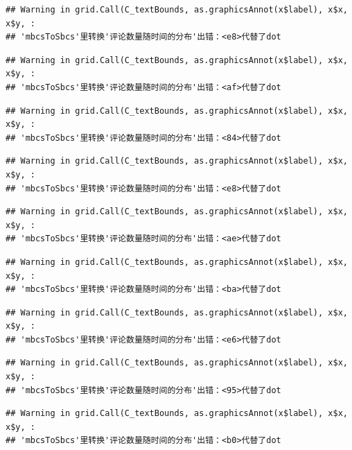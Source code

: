 \documentclass[
]{article}
\begin{document}
\begin{verbatim}
## Warning in grid.Call(C_textBounds, as.graphicsAnnot(x$label), x$x, x$y, :
## 'mbcsToSbcs'里转换'评论数量随时间的分布'出错：<e8>代替了dot
\end{verbatim}

\begin{verbatim}
## Warning in grid.Call(C_textBounds, as.graphicsAnnot(x$label), x$x, x$y, :
## 'mbcsToSbcs'里转换'评论数量随时间的分布'出错：<af>代替了dot
\end{verbatim}

\begin{verbatim}
## Warning in grid.Call(C_textBounds, as.graphicsAnnot(x$label), x$x, x$y, :
## 'mbcsToSbcs'里转换'评论数量随时间的分布'出错：<84>代替了dot
\end{verbatim}

\begin{verbatim}
## Warning in grid.Call(C_textBounds, as.graphicsAnnot(x$label), x$x, x$y, :
## 'mbcsToSbcs'里转换'评论数量随时间的分布'出错：<e8>代替了dot
\end{verbatim}

\begin{verbatim}
## Warning in grid.Call(C_textBounds, as.graphicsAnnot(x$label), x$x, x$y, :
## 'mbcsToSbcs'里转换'评论数量随时间的分布'出错：<ae>代替了dot
\end{verbatim}

\begin{verbatim}
## Warning in grid.Call(C_textBounds, as.graphicsAnnot(x$label), x$x, x$y, :
## 'mbcsToSbcs'里转换'评论数量随时间的分布'出错：<ba>代替了dot
\end{verbatim}

\begin{verbatim}
## Warning in grid.Call(C_textBounds, as.graphicsAnnot(x$label), x$x, x$y, :
## 'mbcsToSbcs'里转换'评论数量随时间的分布'出错：<e6>代替了dot
\end{verbatim}

\begin{verbatim}
## Warning in grid.Call(C_textBounds, as.graphicsAnnot(x$label), x$x, x$y, :
## 'mbcsToSbcs'里转换'评论数量随时间的分布'出错：<95>代替了dot
\end{verbatim}

\begin{verbatim}
## Warning in grid.Call(C_textBounds, as.graphicsAnnot(x$label), x$x, x$y, :
## 'mbcsToSbcs'里转换'评论数量随时间的分布'出错：<b0>代替了dot
\end{verbatim}
\end{document}
